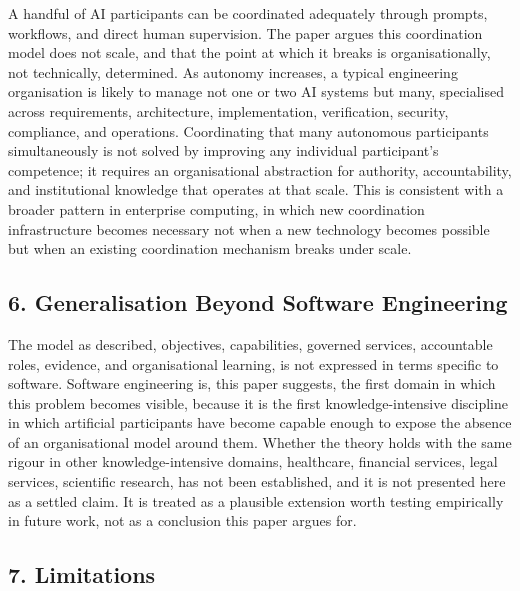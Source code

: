 \documentclass[
]{article}
\begin{document}
A handful of AI participants can be coordinated adequately through
prompts, workflows, and direct human supervision. The paper argues this
coordination model does not scale, and that the point at which it breaks
is organisationally, not technically, determined. As autonomy increases,
a typical engineering organisation is likely to manage not one or two AI
systems but many, specialised across requirements, architecture,
implementation, verification, security, compliance, and operations.
Coordinating that many autonomous participants simultaneously is not
solved by improving any individual participant's competence; it requires
an organisational abstraction for authority, accountability, and
institutional knowledge that operates at that scale. This is consistent
with a broader pattern in enterprise computing, in which new
coordination infrastructure becomes necessary not when a new technology
becomes possible but when an existing coordination mechanism breaks
under scale.

\hypertarget{generalisation-beyond-software-engineering}{%
\subsection{6. Generalisation Beyond Software
Engineering}\label{generalisation-beyond-software-engineering}}

The model as described, objectives, capabilities, governed services,
accountable roles, evidence, and organisational learning, is not
expressed in terms specific to software. Software engineering is, this
paper suggests, the first domain in which this problem becomes visible,
because it is the first knowledge-intensive discipline in which
artificial participants have become capable enough to expose the absence
of an organisational model around them. Whether the theory holds with
the same rigour in other knowledge-intensive domains, healthcare,
financial services, legal services, scientific research, has not been
established, and it is not presented here as a settled claim. It is
treated as a plausible extension worth testing empirically in future
work, not as a conclusion this paper argues for.

\hypertarget{limitations}{%
\subsection{7. Limitations}\label{limitations}}
\end{document}
